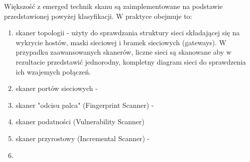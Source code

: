 Większość z emerged technik skanu są zaimplementowane na podstawie przedstawionej powyżej klasyfikacji. W praktyce obejmuje to:
\begin{enumerate}
	\item skaner topologii - użyty do sprawdzania struktury sieci składającej się na wykrycie hostów, maski sieciowej i bramek sieciowych (gateways). W przypadku zaawansowanych skanerów, liczne sieci są skanowane aby w rezultacie przedstawić jednorodny, kompletny diagram sieci do sprawdzenia ich wzajemych połączeń. 
	\item skaner portów sieciowych - 
	\item skaner "odcisu palca" (Fingerprint Scanner) - 
	\item skaner podatności (Vulnerability Scanner)
	\item skaner przyrostowy (Incremental Scanner) - 
	\item
\end{enumerate}






